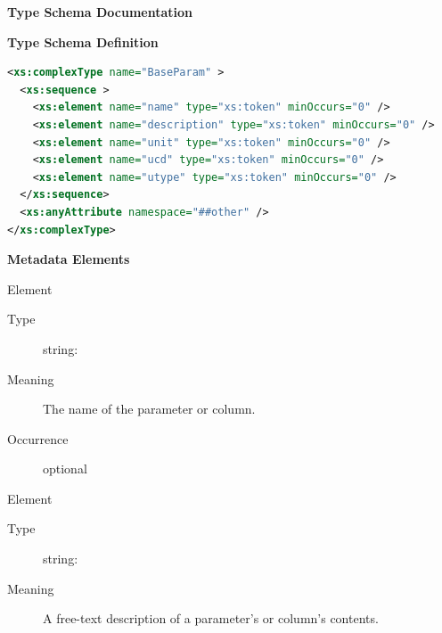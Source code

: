 \documentclass[11pt,a4paper]{ivoa}
\begin{document}
\begin{generated}
\begingroup
      	\renewcommand*\descriptionlabel[1]{%
      	\hbox to 5.5em{\emph{#1}\hfil}}\vspace{2ex}\noindent\textbf{ Type Schema Documentation}



\vspace{1ex}\noindent\textbf{ Type Schema Definition}

\begin{lstlisting}[language=XML,basicstyle=\footnotesize]
<xs:complexType name="BaseParam" >
  <xs:sequence >
    <xs:element name="name" type="xs:token" minOccurs="0" />
    <xs:element name="description" type="xs:token" minOccurs="0" />
    <xs:element name="unit" type="xs:token" minOccurs="0" />
    <xs:element name="ucd" type="xs:token" minOccurs="0" />
    <xs:element name="utype" type="xs:token" minOccurs="0" />
  </xs:sequence>
  <xs:anyAttribute namespace="##other" />
</xs:complexType>
\end{lstlisting}

\vspace{0.5ex}\noindent\textbf{ Metadata Elements}

\begingroup\small\begin{bigdescription}\item[Element \xmlel{name}]
\begin{description}
\item[Type] string: 
\item[Meaning] 
                  The name of the parameter or column.
               
\item[Occurrence] optional

\end{description}
\item[Element \xmlel{description}]
\begin{description}
\item[Type] string: 
\item[Meaning] 
                  A free-text description of a parameter's or column's 
                  contents.
               

\end{description}
\end{bigdescription}
\end{generated}
\end{document}
